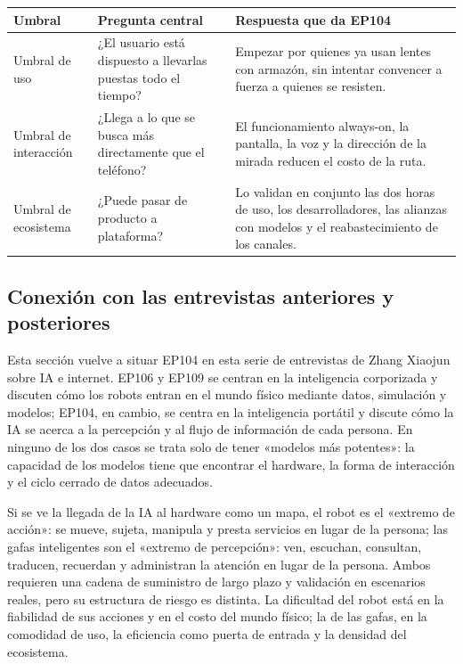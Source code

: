 \noindent\begin{tabularx}{\textwidth}{p{}p{}X}
\toprule
Umbral & Pregunta central & Respuesta que da EP104 \\
\midrule
Umbral de uso & ¿El usuario está dispuesto a llevarlas puestas todo el tiempo? & Empezar por quienes ya usan lentes con armazón, sin intentar convencer a fuerza a quienes se resisten. \\
Umbral de interacción & ¿Llega a lo que se busca más directamente que el teléfono? & El funcionamiento always-on, la pantalla, la voz y la dirección de la mirada reducen el costo de la ruta. \\
Umbral de ecosistema & ¿Puede pasar de producto a plataforma? & Lo validan en conjunto las dos horas de uso, los desarrolladores, las alianzas con modelos y el reabastecimiento de los canales. \\
\bottomrule
\end{tabularx}

\subsection{Conexión con las entrevistas anteriores y posteriores}

Esta sección vuelve a situar EP104 en esta serie de entrevistas de Zhang Xiaojun sobre IA e internet. EP106 y EP109 se centran en la inteligencia corporizada y discuten cómo los robots entran en el mundo físico mediante datos, simulación y modelos; EP104, en cambio, se centra en la inteligencia portátil y discute cómo la IA se acerca a la percepción y al flujo de información de cada persona. En ninguno de los dos casos se trata solo de tener «modelos más potentes»: la capacidad de los modelos tiene que encontrar el hardware, la forma de interacción y el ciclo cerrado de datos adecuados.

Si se ve la llegada de la IA al hardware como un mapa, el robot es el «extremo de acción»: se mueve, sujeta, manipula y presta servicios en lugar de la persona; las gafas inteligentes son el «extremo de percepción»: ven, escuchan, consultan, traducen, recuerdan y administran la atención en lugar de la persona. Ambos requieren una cadena de suministro de largo plazo y validación en escenarios reales, pero su estructura de riesgo es distinta. La dificultad del robot está en la fiabilidad de sus acciones y en el costo del mundo físico; la de las gafas, en la comodidad de uso, la eficiencia como puerta de entrada y la densidad del ecosistema.

